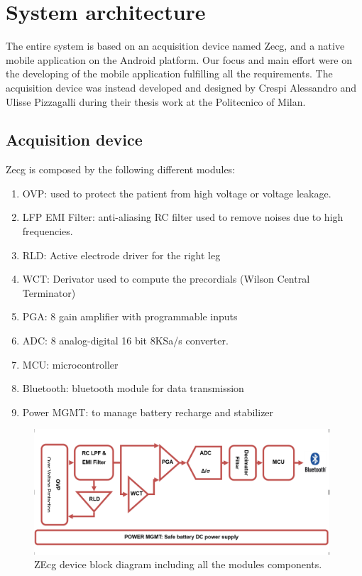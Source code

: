 \chapter{System architecture}
\label{Chapter8}
The entire system is based on an acquisition device named Zecg, and a native mobile application on the Android platform. Our focus and main effort were on the developing of the mobile application fulfilling all the requirements. The acquisition device was instead developed and designed by Crespi Alessandro and Ulisse Pizzagalli during their thesis work at the Politecnico of Milan.
\section{Acquisition device}
Zecg is composed by the following different modules:
\begin{enumerate}
	\item OVP: used to protect the patient from high voltage or voltage leakage.
	\item LFP EMI Filter: anti-aliasing RC filter used to remove noises due to high frequencies.
	\item RLD: Active electrode driver for the right leg
	\item WCT: Derivator used to compute the precordials (Wilson Central Terminator)
	\item PGA: 8 gain amplifier with programmable inputs
	\item ADC: 8 analog-digital 16 bit 8KSa/s converter.
	\item MCU: microcontroller
	\item Bluetooth: bluetooth module for data transmission
	\item Power MGMT: to manage battery recharge and stabilizer
\end{enumerate}
\begin{figure}[ht!]
	\centering
	\includegraphics[width=110mm]{figures/ch8/1.png}
	\caption{ZEcg device block diagram including all the modules components.}
	\label{fig8.1}
\end{figure}
